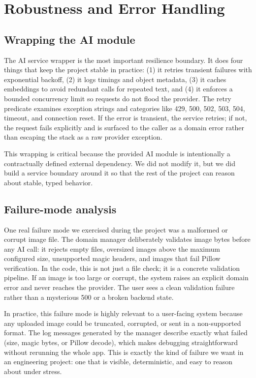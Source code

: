 \documentclass[11pt,a4paper]{article}
\begin{document}
\section{Robustness and Error Handling}
\subsection{Wrapping the AI module}
The AI service wrapper is the most important resilience boundary. It does four things that keep the project stable in practice: (1) it retries transient failures with exponential backoff, (2) it logs timings and object metadata, (3) it caches embeddings to avoid redundant calls for repeated text, and (4) it enforces a bounded concurrency limit so requests do not flood the provider. The retry predicate examines exception strings and categories like 429, 500, 502, 503, 504, timeout, and connection reset. If the error is transient, the service retries; if not, the request fails explicitly and is surfaced to the caller as a domain error rather than escaping the stack as a raw provider exception.

This wrapping is critical because the provided AI module is intentionally a contractually defined external dependency. We did not modify it, but we did build a service boundary around it so that the rest of the project can reason about stable, typed behavior.

\subsection{Failure-mode analysis}
One real failure mode we exercised during the project was a malformed or corrupt image file. The domain manager deliberately validates image bytes before any AI call: it rejects empty files, oversized images above the maximum configured size, unsupported magic headers, and images that fail Pillow verification. In the code, this is not just a file check; it is a concrete validation pipeline. If an image is too large or corrupt, the system raises an explicit domain error and never reaches the provider. The user sees a clean validation failure rather than a mysterious 500 or a broken backend state.

In practice, this failure mode is highly relevant to a user-facing system because any uploaded image could be truncated, corrupted, or sent in a non-supported format. The log messages generated by the manager describe exactly what failed (size, magic bytes, or Pillow decode), which makes debugging straightforward without rerunning the whole app. This is exactly the kind of failure we want in an engineering project: one that is visible, deterministic, and easy to reason about under stress.
\end{document}
